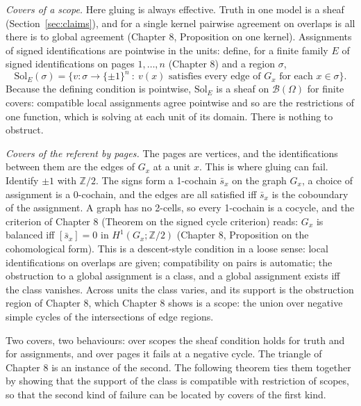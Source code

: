 \documentclass[11pt]{article}
\theoremstyle{plain}
\theoremstyle{definition}
\theoremstyle{remark}
\newcommand{\Om}{\Omega}
\newcommand{\B}{\mathcal{B}}
\newcommand{\Zt}{\mathbb{Z}/2}
\newcommand{\Sol}{\mathrm{Sol}}
\begin{document}
\emph{Covers of a scope.} Here gluing is always effective. Truth in one model is a sheaf (Section~\ref{sec:claims}), and for a single kernel pairwise agreement on overlaps is all there is to global agreement (Chapter 8, Proposition on one kernel). Assignments of signed identifications are pointwise in the units: define, for a finite family $E$ of signed identifications on pages $1,\dots,n$ (Chapter 8) and a region $\sigma$,
\[
\Sol_E(\sigma)=\{v:\sigma\to\{\pm1\}^n\ :\ v(x)\text{ satisfies every edge of }G_x\text{ for each }x\in\sigma\}.
\]
Because the defining condition is pointwise, $\Sol_E$ is a sheaf on $\B(\Om)$ for finite covers: compatible local assignments agree pointwise and so are the restrictions of one function, which is solving at each unit of its domain. There is nothing to obstruct.

\emph{Covers of the referent by pages.} The pages are vertices, and the identifications between them are the edges of $G_x$ at a unit $x$. This is where gluing can fail. Identify $\pm1$ with $\Zt$. The signs form a 1-cochain $\bar s_x$ on the graph $G_x$, a choice of assignment is a 0-cochain, and the edges are all satisfied iff $\bar s_x$ is the coboundary of the assignment. A graph has no 2-cells, so every 1-cochain is a cocycle, and the criterion of Chapter 8 (Theorem on the signed cycle criterion) reads: $G_x$ is balanced iff $[\bar s_x]=0$ in $H^1(G_x;\Zt)$ (Chapter 8, Proposition on the cohomological form). %
This is a descent-style condition in a loose sense: local identifications on overlaps are given; compatibility on pairs is automatic; the obstruction to a global assignment is a class, and a global assignment exists iff the class vanishes. Across units the class varies, and its support is the obstruction region of Chapter 8, which Chapter 8 shows is a scope: the union over negative simple cycles of the intersections of edge regions.

Two covers, two behaviours: over scopes the sheaf condition holds for truth and for assignments, and over pages it fails at a negative cycle. The triangle of Chapter 8 is an instance of the second. The following theorem ties them together by showing that the support of the class is compatible with restriction of scopes, so that the second kind of failure can be located by covers of the first kind.
\end{document}
